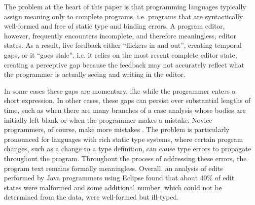%
The problem at the heart of this paper is that
programming languages typically assign meaning only to {complete programs}, i.e. programs that are syntactically well-formed and free of static type and binding errors. A program editor, however, frequently encounters incomplete, and therefore meaningless, editor states. As a result, live feedback either ``flickers in and out'', creating temporal gaps, or it ``goes stale'', i.e. it relies on the most recent complete editor state, creating a perceptive gap because the feedback may not accurately reflect what the programmer is actually seeing and writing in the editor.

In some cases these gaps are momentary, like while the programmer
enters
a short expression. In other cases, these gaps can persist over substantial lengths of time, such as when there are many branches of a case analysis whose bodies are initially left blank or when the programmer makes a mistake.
%
Novice programmers, of course, make more mistakes \cite{mccauley2008debugging,fitzgerald2008debugging}.
%
The problem is particularly pronounced for languages with rich static type systems, where certain program changes, such as a change to a type definition, can cause type errors to propagate throughout the program. Throughout the process of addressing these errors, the program text remains formally meaningless. 
Overall, an analysis of edits performed by Java programmers using Eclipse found that about 40\% of edit states were malformed \cite{popl-paper,6883030} and some additional number, which could not be determined from the data, were well-formed but ill-typed.


